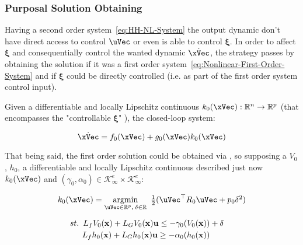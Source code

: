 \subsubsection{Purposal Solution Obtaining}
\label{subsub:quadratic_program_formulation}

Having a second order system~\eqref{eq:HH-NL-System} the output dynamic don't have direct access to control \(\uVec\) or even is able to control \(\mathbf{\xi}\). In order to affect \(\mathbf{\xi}\) and consequentially control the wanted dynamic \(\dot{\xVec}\), the strategy passes by obtaining the solution if it was a first order system~\eqref{eq:Nonlinear-First-Order-System} and if \(\mathbf{\xi}\) could be directly controlled (i.e. as part of the first order system control input). \par

Given a differentiable and locally Lipschitz continuous \(k_0(\xVec):\mathbb{R}^n \to \mathbb{R}^p\) (that encompasses the "controllable \(\mathbf{\xi}\)" ), the closed-loop system:

\begin{equation}
    \dot{\xVec} = f_0(\xVec) + g_0(\xVec) k_0(\xVec)\\ 
 \label{eq:NL-CL-System-0Backstep}
\end{equation}

That being said, the first order solution could be obtained via , so supposing a  \(V_0\),   \(h_0\),  a differentiable and locally Lipschitz continuous described just now \(k_0(\xVec)\) and \((\gamma_0, \alpha_0) \in \mathcal{K}^e_\infty \times \mathcal{K}^e_\infty\):

\begin{equation}
    \begin{array}{l}
        k_0(\xVec) = \underset{\uVec \in \mathbb{R}^p, \hspace{0.2em} \delta \in \mathbb{R}}{\mathrm{argmin}} \quad \hspace{-0.5em} \frac{1}{2} (\uVec^\top R_0 \uVec + p_0\delta^2 ) \vspace{1em} \\ 
        \quad \hspace{0.5em}  st. \hspace{0.5em} L_fV_0(\mathbf{x}) + L_GV_0(\mathbf{x})\mathbf{u} \leq -\gamma_0(V_0(\mathbf{x})) + \delta \vspace{0.25em}\\
        \quad \quad \hspace{1em} L_fh_0(\mathbf{x}) + L_Gh_0(\mathbf{x})\mathbf{u} \geq -\alpha_0(h_0(\mathbf{x}))
    \end{array}
 \label{eq:CLF-CBF-QP-relaxed-0Backstep}
\end{equation}


